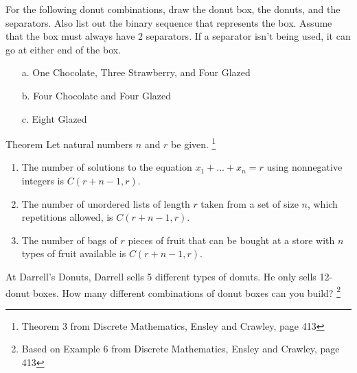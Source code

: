 {    
    \begin{questionNOGRADE}{\thequestion}
        For the following donut combinations, draw the donut box, the donuts, and the separators.
        Also list out the binary sequence that represents the box.
        Assume that the box must always have 2 separators. If a separator isn't being used, it can
        go at either end of the box.

        \begin{enumerate}
            \item[a.]   One Chocolate, Three Strawberry, and Four Glazed
            \item[b.]   Four Chocolate and Four Glazed
            \item[c.]   Eight Glazed
        \end{enumerate}
    \end{questionNOGRADE}

    \newpage

    \begin{intro}{Theorem}
        Let natural numbers $n$ and $r$ be given.
        \footnote{Theorem 3 from Discrete Mathematics, Ensley and Crawley, page 413}

        \begin{enumerate}
            \item   The number of solutions to the equation $x_{1} + ... + x_{n} = r$
            using nonnegative integers is $C(r + n - 1, r)$.
            \item   The number of unordered lists of length $r$ taken from a set of size $n$,
            which repetitions allowed, is $C(r + n - 1, r)$.
            \item   The number of bags of $r$ pieces of fruit that can be bought at a store with $n$
            types of fruit available is $C(r + n - 1, r)$.
        \end{enumerate}
    \end{intro}
    
    \begin{questionNOGRADE}{\thequestion}
        At Darrell's Donuts, Darrell sells 5 different types of donuts.
        He only sells 12-donut boxes. How many different combinations
        of donut boxes can you build?
        \footnote{Based on Example 6 from Discrete Mathematics, Ensley and Crawley, page 413}


\end{questionNOGRADE}}
